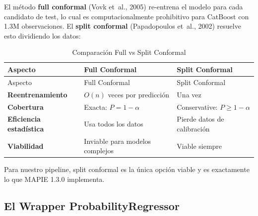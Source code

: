 \documentclass[
  spanish,
  11pt,
  letterpaper,
]{scrbook}
\theoremstyle{plain}
\theoremstyle{remark}
\begin{document}
El método \textbf{full conformal} (Vovk et~al., 2005) re-entrena el
modelo para cada candidato de test, lo cual es computacionalmente
prohibitivo para CatBoost con 1.3M observaciones. El \textbf{split
conformal} (Papadopoulos et~al., 2002) resuelve esto dividiendo los
datos:

\begin{longtable}[]{@{}
  >{\raggedright\arraybackslash}p{}
  >{\raggedright\arraybackslash}p{}
  >{\raggedright\arraybackslash}p{}@{}}
\caption{Comparación Full vs Split
Conformal}\label{tbl-full-vs-split}\tabularnewline
\toprule\noalign{}
\begin{minipage}[b]{\linewidth}\raggedright
Aspecto
\end{minipage} & \begin{minipage}[b]{\linewidth}\raggedright
Full Conformal
\end{minipage} & \begin{minipage}[b]{\linewidth}\raggedright
Split Conformal
\end{minipage} \\
\midrule\noalign{}
\endfirsthead
\toprule\noalign{}
\begin{minipage}[b]{\linewidth}\raggedright
Aspecto
\end{minipage} & \begin{minipage}[b]{\linewidth}\raggedright
Full Conformal
\end{minipage} & \begin{minipage}[b]{\linewidth}\raggedright
Split Conformal
\end{minipage} \\
\midrule\noalign{}
\endhead
\bottomrule\noalign{}
\endlastfoot
\textbf{Reentrenamiento} & \(O(n)\) veces por predicción & Una vez \\
\textbf{Cobertura} & Exacta: \(P = 1-\alpha\) & Conservative:
\(P \geq 1-\alpha\) \\
\textbf{Eficiencia estadística} & Usa todos los datos & Pierde datos de
calibración \\
\textbf{Viabilidad} & Inviable para modelos complejos & Viable
siempre \\
\end{longtable}

Para nuestro pipeline, split conformal es la única opción viable y es
exactamente lo que MAPIE 1.3.0 implementa.

\subsection{El Wrapper
ProbabilityRegressor}\label{sec-probability-regressor}
\end{document}
